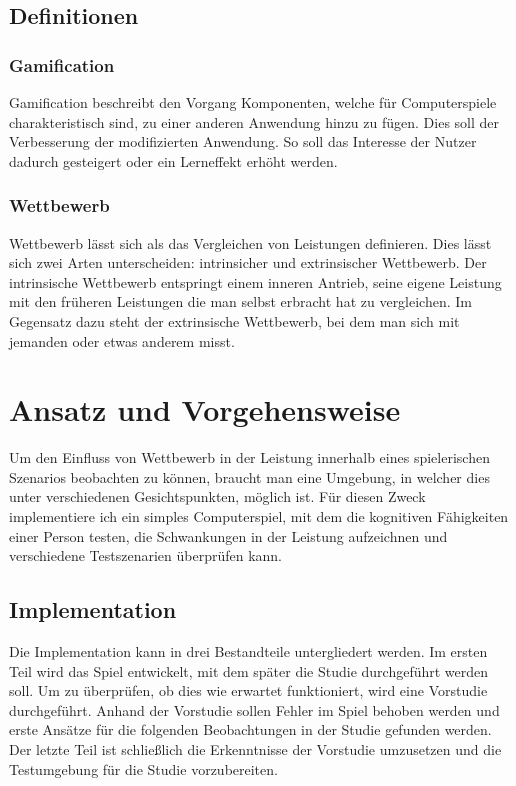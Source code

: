 \section{Definitionen}
\subsection{Gamification}
Gamification beschreibt den Vorgang Komponenten, welche für Computerspiele charakteristisch sind, zu einer anderen Anwendung hinzu zu fügen. Dies soll der Verbesserung der modifizierten Anwendung. So soll das Interesse der Nutzer dadurch gesteigert oder ein Lerneffekt erhöht werden.

\subsection{Wettbewerb}
Wettbewerb lässt sich als das Vergleichen von Leistungen definieren. Dies lässt sich zwei Arten unterscheiden: intrinsicher und extrinsischer Wettbewerb.\newline
Der intrinsische Wettbewerb entspringt einem inneren Antrieb, seine eigene Leistung mit den früheren Leistungen die man selbst erbracht hat zu vergleichen.\newline
Im Gegensatz dazu steht der extrinsische Wettbewerb, bei dem man sich mit jemanden oder etwas anderem misst.\cite{Deci1981}




\chapter{Ansatz und Vorgehensweise}
 Um den Einfluss von Wettbewerb in der Leistung innerhalb eines spielerischen Szenarios beobachten zu können, braucht man eine Umgebung, in welcher dies unter verschiedenen Gesichtspunkten, möglich ist. Für diesen Zweck implementiere ich ein simples Computerspiel, mit dem die kognitiven Fähigkeiten einer Person testen, die Schwankungen in der Leistung aufzeichnen und verschiedene Testszenarien überprüfen kann.
 
\section{Implementation}
Die Implementation kann in drei Bestandteile untergliedert werden. Im ersten Teil wird das Spiel entwickelt, mit dem später die Studie durchgeführt werden soll. Um zu überprüfen, ob dies wie erwartet funktioniert, wird eine Vorstudie durchgeführt. Anhand der Vorstudie sollen Fehler im Spiel behoben werden und erste Ansätze für die folgenden Beobachtungen in der Studie gefunden werden. Der letzte  Teil ist schließlich die Erkenntnisse der Vorstudie umzusetzen und die Testumgebung für die Studie vorzubereiten.

